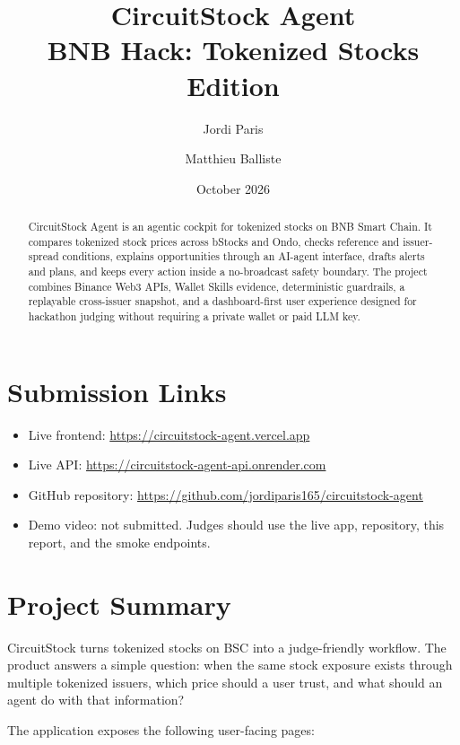 \documentclass[11pt,a4paper]{article}
\title{\textbf{CircuitStock Agent}\\BNB Hack: Tokenized Stocks Edition}
\author{Jordi Paris \and Matthieu Balliste}
\date{October 2026}
\begin{document}
\maketitle

\begin{abstract}
CircuitStock Agent is an agentic cockpit for tokenized stocks on BNB Smart Chain. It compares tokenized stock prices across bStocks and Ondo, checks reference and issuer-spread conditions, explains opportunities through an AI-agent interface, drafts alerts and plans, and keeps every action inside a no-broadcast safety boundary. The project combines Binance Web3 APIs, Wallet Skills evidence, deterministic guardrails, a replayable cross-issuer snapshot, and a dashboard-first user experience designed for hackathon judging without requiring a private wallet or paid LLM key.
\end{abstract}

\section{Submission Links}

\begin{itemize}
  \item Live frontend: \url{https://circuitstock-agent.vercel.app}
  \item Live API: \url{https://circuitstock-agent-api.onrender.com}
  \item GitHub repository: \url{https://github.com/jordiparis165/circuitstock-agent}
  \item Demo video: not submitted. Judges should use the live app, repository, this report, and the smoke endpoints.
\end{itemize}

\section{Project Summary}

CircuitStock turns tokenized stocks on BSC into a judge-friendly workflow. The product answers a simple question: when the same stock exposure exists through multiple tokenized issuers, which price should a user trust, and what should an agent do with that information?

The application exposes the following user-facing pages:
\end{document}
